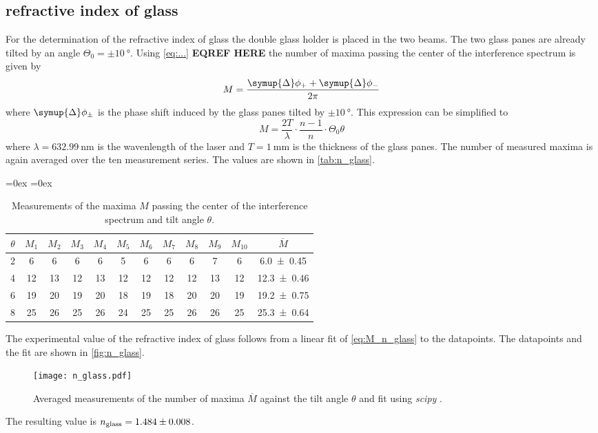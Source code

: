 \subsection{refractive index of glass}
For the determination of the refractive index of glass the double glass holder is placed in the two beams. The two glass panes are already tilted by an angle 
$\Theta_0 = \pm\qty{10}{\degree}$. 
Using \autoref{eq:...} \textbf{EQREF HERE} the number of maxima passing the center of the interference spectrum is given by
\begin{equation*}
  M = \frac{\symup{\Delta}\phi_+ + \symup{\Delta}\phi_-}{2\pi}
\end{equation*}
where $\symup{\Delta}\phi_\pm$ is the phase shift induced by the glass panes tilted by $\pm\qty{10}{\degree}$. 
This expression can be simplified to 
\begin{equation}
  \label{eq:M_n_glass}
  M = \frac{2T}{\lambda} \cdot \frac{n-1}{n} \cdot \Theta_0 \theta
\end{equation}
where $\lambda = \qty{632.99}{\nano\metre}$ is the wavenlength of the laser and $T = \qty{1}{\milli\metre}$ is the thickness of the glass panes.
The number of measured maxima is again averaged over the ten measurement series. The values are shown in \autoref{tab:n_glass}.
\begin{table}
  \centering
  \aboverulesep=0ex %
  \belowrulesep=0ex %
  \caption{Measurements of the maxima $M$ passing the center of the interference spectrum and tilt angle $\theta$.}
  \label{tab:n_glass}
  \begin{tabular}{c | c c c c c c c c c c | c}
    \toprule
    {$\theta$} & {$M_1$} & {$M_2$} & {$M_3$} & {$M_4$} & {$M_5$} & {$M_6$} & {$M_7$} & {$M_8$} & {$M_9$} & {$M_{10}$}  & {$\overline{M}$} \\
    \midrule
    \rule{0pt}{1.1EM}
    {2} &  6 &  6 &  6 &  6 &  5 &  6 &  6 &  6 &  7 &  6 & {\num{ 6.0 +- 0.45}} \\
    {4} & 12 & 13 & 12 & 13 & 12 & 12 & 12 & 12 & 13 & 12 & {\num{12.3 +- 0.46}} \\
    {6} & 19 & 20 & 19 & 20 & 18 & 19 & 18 & 20 & 20 & 19 & {\num{19.2 +- 0.75}} \\
    {8} & 25 & 26 & 25 & 26 & 24 & 25 & 25 & 26 & 26 & 25 & {\num{25.3 +- 0.64}} \\
    \bottomrule
  \end{tabular}
\end{table}
The experimental value of the refractive index of glass follows from a linear fit of \autoref{eq:M_n_glass} to the datapoints.
The datapoints and the fit are shown in \autoref{fig:n_glass}.
\begin{figure}
  \centering
  \texttt{[image: n\_glass.pdf]}
  \caption{Averaged measurements of the number of maxima $\overline{M}$ against the tilt angle $\theta$ and fit using \textit{scipy} \cite{scipy}.}
  \label{fig:n_glass}
\end{figure}
The resulting value is $n_\text{glass} = \num{1.484 +- 0.008}$.

